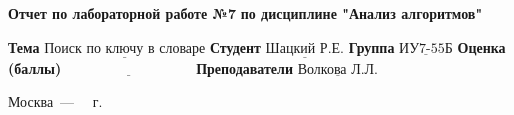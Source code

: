 \begin{titlepage}
	\begin{center}
		\noindent\begin{minipage}{1.3\textwidth}
					 \centering
					 \Large\textbf{Отчет по лабораторной работе №7}\newline
					 \textbf{по дисциплине "Анализ алгоритмов"}\newline\newline
		\end{minipage}
	\end{center}

	\noindent\textbf{Тема} $\underline{\text{Поиск по ключу в словаре}}$\newline\newline
	\noindent\textbf{Студент} $\underline{\text{Шацкий Р.Е.}}$\newline\newline
	\noindent\textbf{Группа} $\underline{\text{ИУ7-55Б}}$\newline\newline
	\noindent\textbf{Оценка (баллы)} $\underline{\text{~~~~~~~~~~~~~~~~~~~~~~~~~~~}}$\newline\newline
	\noindent\textbf{Преподаватели} $\underline{\text{Волкова Л.Л.}}$\newline\newline\newline

	\begin{center}
		\vfill
		Москва~---~\the\year
		~г.
	\end{center}
\end{titlepage}
